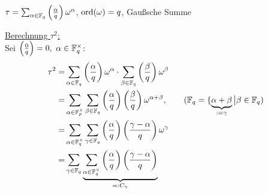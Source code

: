 \documentclass[a4paper,twoside,DIV15,BCOR12mm]{scrbook}
\begin{document}
$\tau = \sum_{\alpha \in
\mathbb{F}_q}\left(\frac{\alpha}{q}\right)\omega^\alpha$, $\mathop{\rm ord}\nolimits(\omega) =
q$, Gaußsche Summe

\underline{Berechnung $\tau^2$:}\\
Sei $\left(\frac{0}{q}\right) = 0,\ \alpha \in \mathbb{F}_q^\times$:
\begin{align*}
\tau^2 = &\sum_{\alpha \in \mathbb{F}_q}\left(\frac{\alpha}{q}\right)\omega^\alpha \cdot \sum_{\beta \in \mathbb{F}_q}\left(\frac{\beta}{q}\right)\omega^\beta \\
=& \sum_{\alpha \in \mathbb{F}_p^\times} \sum_{\beta \in \mathbb{F}_q}\left(\frac{\alpha}{q}\right)\left(\frac{\beta}{q}\right)\omega^{\alpha + \beta},\qquad   (\mathbb{F}_q = \{\underbrace{\alpha + \beta}_{:= \gamma} \big| \beta \in \mathbb{F}_q) \\
=& \sum_{\alpha \in \mathbb{F}_q^\times} \sum_{\gamma \in \mathbb{F}_q} \left(\frac{\alpha}{q}\right)\left(\frac{\gamma - \alpha}{q}\right)\omega^\gamma  \\
=& \sum_{\gamma \in \mathbb{F}_q} \underbrace{\sum_{\alpha \in \mathbb{F}_q^\times} \left(\frac{\alpha}{q}\right)\left(\frac{\gamma - \alpha}{q}\right)}_{=: C_\gamma}  \\
\end{align*}
\end{document}
